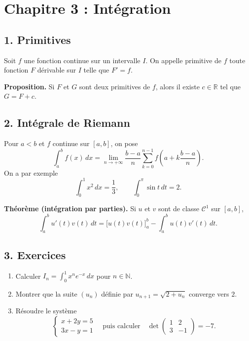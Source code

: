 \documentclass[11pt,a4paper]{article}
\begin{document}
\section*{Chapitre 3 : Intégration}
\subsection*{1. Primitives}
Soit $f$ une fonction continue sur un intervalle $I$. On appelle primitive de $f$ toute fonction $F$ dérivable sur $I$ telle que $F' = f$.

\textbf{Proposition.} Si $F$ et $G$ sont deux primitives de $f$, alors il existe $c \in \mathbb{R}$ tel que $G = F + c$.

\subsection*{2. Intégrale de Riemann}
Pour $a < b$ et $f$ continue sur $[a,b]$, on pose
\[
\int_a^b f(x)\,dx = \lim_{n \to +\infty} \frac{b-a}{n} \sum_{k=0}^{n-1} f\left(a + k\frac{b-a}{n}\right).
\]
On a par exemple
\[
\int_0^1 x^2\,dx = \frac{1}{3}, \qquad \int_0^{\pi} \sin t \, dt = 2 .
\]

\textbf{Théorème (intégration par parties).} Si $u$ et $v$ sont de classe $\mathcal{C}^1$ sur $[a,b]$,
\begin{equation}
\int_a^b u'(t)v(t)\,dt = \big[u(t)v(t)\big]_a^b - \int_a^b u(t)v'(t)\,dt .
\end{equation}

\subsection*{3. Exercices}
\begin{enumerate}
\item Calculer $\displaystyle I_n = \int_0^1 x^n e^{-x}\,dx$ pour $n \in \mathbb{N}$.
\item Montrer que la suite $(u_n)$ définie par $u_{n+1} = \sqrt{2 + u_n}$ converge vers $2$.
\item Résoudre le système
\[
\begin{cases} x + 2y = 5 \\ 3x - y = 1 \end{cases}
\quad\text{puis calculer}\quad
\det\begin{pmatrix} 1 & 2 \\ 3 & -1 \end{pmatrix} = -7 .
\]
\end{enumerate}
\end{document}
